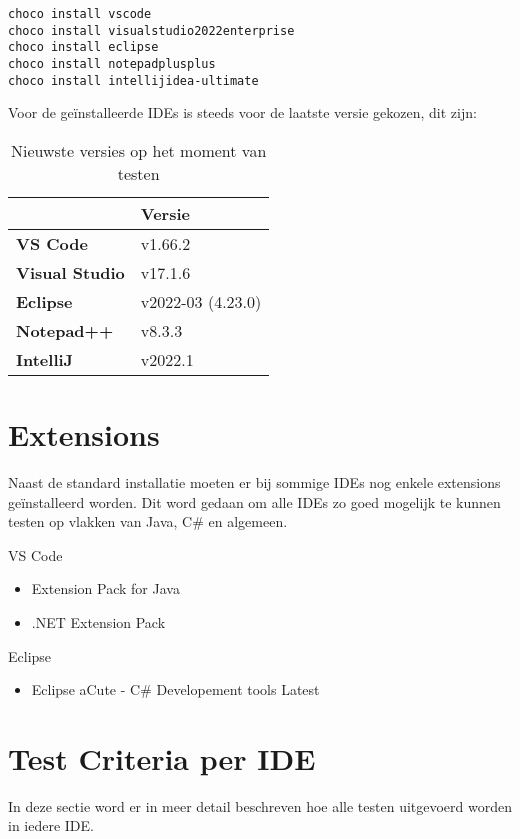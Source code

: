 \begin{verbatim}
choco install vscode
choco install visualstudio2022enterprise
choco install eclipse
choco install notepadplusplus
choco install intellijidea-ultimate
\end{verbatim}

Voor de geïnstalleerde IDEs is steeds voor de laatste versie gekozen, dit zijn:
\begin{table}[h!]
	\centering
	\begin{tabular}{  l l }
		\hline
		                       & \textbf{Versie}   \\
		\hline
		\textbf{VS Code}       & v1.66.2           \\
		\textbf{Visual Studio} & v17.1.6           \\
		\textbf{Eclipse}       & v2022-03 (4.23.0) \\
		\textbf{Notepad++}     & v8.3.3            \\
		\textbf{IntelliJ}      & v2022.1           \\
		\hline
	\end{tabular}
	\caption{Nieuwste versies op het moment van testen }
	\label{tab:versie}
\end{table}

\section{Extensions}
Naast de standard installatie moeten er bij sommige IDEs nog enkele extensions geïnstalleerd worden. Dit word gedaan om alle IDEs zo goed mogelijk te kunnen testen op vlakken van Java, C\# en algemeen.

VS Code
\begin{itemize}
	\item Extension Pack for Java
	\item .NET Extension Pack
\end{itemize}

Eclipse
\begin{itemize}
	\item Eclipse aCute - C\# Developement tools Latest
\end{itemize}

\section{Test Criteria per IDE}
In deze sectie word er in meer detail beschreven hoe alle testen uitgevoerd worden in iedere IDE.


